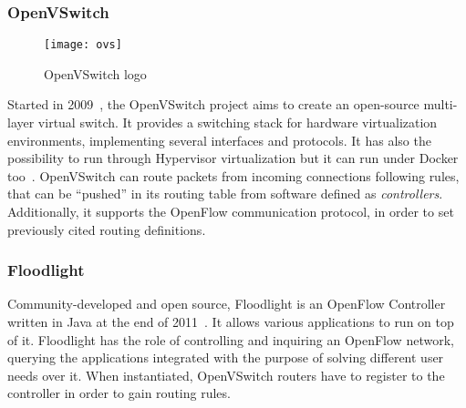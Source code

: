 \subsubsection{OpenVSwitch}
\begin{figure}[t]
  \centering
  \texttt{[image: ovs]}
  \caption[OpenVSwitch logo]{OpenVSwitch logo}
\end{figure}
Started in 2009~\cite{ovsGit}, the OpenVSwitch project aims to create an
open-source multi-layer virtual switch. It provides a switching stack for
hardware virtualization environments, implementing several interfaces and
protocols. It has also the possibility to run through Hypervisor virtualization
but it can run under Docker too~\cite{ovsDocker}. OpenVSwitch can route packets
from incoming connections following rules, that can be ``pushed'' in its routing
table from software defined as \textit{controllers}. Additionally, it supports
the OpenFlow communication protocol, in order to set previously cited routing
definitions.

\subsubsection{Floodlight}
\label{chap:prjan:sec:tech:sub:other:sub:floodlight}
Community-developed and open source, Floodlight is an OpenFlow Controller
written in Java at the end of 2011~\cite{floodlightGit}. It allows various
applications to run on top of it. Floodlight has the role of controlling and
inquiring an OpenFlow network, querying the applications integrated with the
purpose of solving different user needs over it. When instantiated, OpenVSwitch
routers have to register to the controller in order to gain routing rules.


